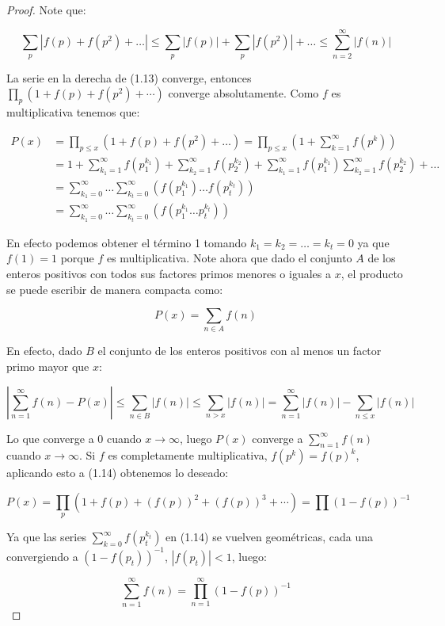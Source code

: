 \begin{proof}
Note que:

\begin{equation}
\sum_{p}\left|f(p)+f(p^2)+\ldots\right|\leq \sum_p \left|f(p)\right|+\sum_p \left|f(p^2)\right|+\ldots\leq\sum_{n=2}^{\infty} \left|f(n)\right|
\end{equation}

La serie en la derecha de (1.13) converge, entonces $\displaystyle\prod_p\left(1+f(p)+f\left(p^2\right)+\cdots\right)$ converge absolutamente. Como $f$ es multiplicativa tenemos que:

\begin{equation}
\begin{aligned}
P(x)&=\prod_{p\leq x}\left(1+f(p)+f(p^2)+\ldots\right)=\prod_{p\leq x}\left(1+\sum_{k=1}^{\infty} f(p^k)\right)\\
&=1+\sum_{k_1=1}^{\infty}f(p_1^{k_1})+\sum_{k_2=1}^{\infty}f(p_2^{k_2})+\sum_{k_1=1}^{\infty} f(p_1^{k_1})\sum_{k_2=1}^{\infty} f(p_2^{k_2})+\ldots\\
&=\sum_{k_1=0}^{\infty}\ldots \sum_{k_t=0}^{\infty}(f(p_1^{k_1})\ldots f(p_t^{k_t}))\\
&=\sum_{k_1=0}^{\infty}\ldots \sum_{k_t=0}^{\infty}(f(p_1^{k_1}\ldots p_t^{k_t}))
\end{aligned}
\end{equation}

En efecto podemos obtener el término 1 tomando $k_1=k_2=\ldots=k_t=0$ ya que $f(1)=1$ porque $f$ es multiplicativa. Note ahora que dado el conjunto $A$ de los enteros positivos con todos sus factores primos menores o iguales a $x$, el producto se puede escribir de manera compacta como:

$$P(x)=\sum_{n\in A}f(n)$$

En efecto, dado $B$ el conjunto de los enteros positivos con al menos un factor primo mayor que $x$:

$$
\left|\sum_{n=1}^{\infty} f(n)-P(x)\right| \leq \sum_{n \in B}|f(n)| \leq \sum_{n>x}|f(n)|=\sum_{n=1}^{\infty}|f(n)|-\sum_{n \leq x}|f(n)|
$$

Lo que converge a $0$ cuando $x\to \infty$, luego $P(x)$ converge a $\displaystyle \sum_{n=1}^{\infty} f(n)$ cuando $x\to \infty$. Si $f$ es completamente  multiplicativa, $f(p^k)=f(p)^k$, aplicando esto a (1.14) obtenemos lo deseado:

$$P(x)=\prod_p\left(1+f(p)+(f(p))^2+(f(p))^3+\cdots\right)=\prod(1-f(p))^{-1}$$

Ya que las series $\displaystyle\sum_{k=0}^{\infty}f(p_t^{k_t})$ en (1.14) se vuelven geométricas, cada una convergiendo a $(1-f(p_t))^{-1}$, $\left|f(p_t)\right|<1
    $, luego:

$$\sum_{n=1}^{\infty} f(n)=\prod_{n=1}^{\infty} (1-f(p))^{-1}$$
\end{proof}

